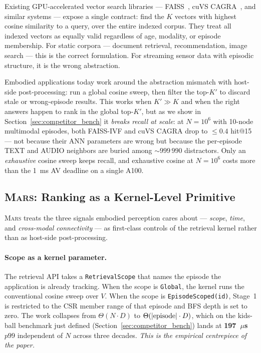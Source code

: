 \documentclass[11pt]{article}
\newcommand{\mars}{\textsc{Mars}}
\begin{document}
Existing GPU-accelerated vector search libraries ---
FAISS~\cite{faiss}, cuVS CAGRA~\cite{cuvs}, and similar systems ---
expose a single contract: find the $K$ vectors with highest cosine
similarity to a query, over the entire indexed corpus. They treat all
indexed vectors as equally valid regardless of age, modality, or
episode membership. For static corpora --- document retrieval,
recommendation, image search --- this is the correct formulation.
For streaming sensor data with episodic structure, it is the wrong
abstraction.

Embodied applications today work around the abstraction mismatch with
host-side post-processing: run a global cosine sweep, then filter the
top-$K'$ to discard stale or wrong-episode results. This works when
$K' \gg K$ and when the right answers happen to rank in the global
top-$K'$, but as we show in Section~\ref{sec:competitor_bench} it
\emph{breaks recall at scale}: at $N{=}10^6$ with 10-node multimodal
episodes, both FAISS-IVF and cuVS CAGRA drop to $\le 0.4$ hit@15 ---
not because their ANN parameters are wrong but because the
per-episode TEXT and AUDIO neighbors are buried among ${\sim}999\,990$
distractors. Only an \emph{exhaustive} cosine sweep keeps recall, and
exhaustive cosine at $N{=}10^6$ costs more than the 1~ms AV deadline
on a single A100.

\subsection{\mars{}: Ranking as a Kernel-Level Primitive}

\mars{} treats the three signals embodied perception cares about ---
\emph{scope}, \emph{time}, and \emph{cross-modal connectivity} ---
as first-class controls of the retrieval kernel rather than as
host-side post-processing.

\paragraph{Scope as a kernel parameter.} The retrieval API takes a
\texttt{RetrievalScope} that names the episode the application is
already tracking. When the scope is \texttt{Global}, the kernel runs
the conventional cosine sweep over $V$. When the scope is
\texttt{EpisodeScoped(id)}, Stage~1 is restricted to the CSR member
range of that episode and BFS depth is set to zero. The work
collapses from $\Theta(N \cdot D)$ to $\Theta(|\textnormal{episode}|
\cdot D)$, which on the kids-ball benchmark just defined
(Section~\ref{sec:competitor_bench}) lands at \textbf{197~$\mu$s
$p99$} independent of $N$ across three decades. \emph{This is the
empirical centrepiece of the paper.}
\end{document}

